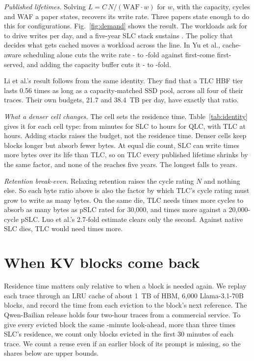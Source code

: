 \documentclass[journal]{IEEEtran}
\begin{document}
\emph{Published lifetimes.} Solving $L = C\,N/(\mathrm{WAF}\cdot w)$ for $w$, with the capacity, cycles and WAF a paper states, recovers its write rate. Three papers state enough to do this for \RecN{} configurations.\cite{yu2026hbf,baek2026hotcold,peng2026gr} Fig.~\ref{fig:demand} shows the result. The workloads ask for \RecDwpdMin{} to \RecDwpdMax{} drive writes per day, and a five-year SLC stack sustains \DwpdSLC{}. The policy that decides what gets cached moves a workload across the line. In Yu et al., cache-aware scheduling alone cuts the write rate \YuPlainCutMin{}- to \YuPlainCutMax{}-fold against first-come first-served, and adding the capacity buffer cuts it \YuCutMin{}- to \YuCutMax{}-fold.

Li et al.'s result follows from the same identity. They find that a TLC HBF tier lasts 0.56 times as long as a capacity-matched SSD pool, across all four of their traces. Their own budgets, 21.7 and 38.4~TB per day, have exactly that ratio.\cite{li2026hbfsucks}

\emph{What a denser cell changes.} The cell sets the residence time. Table~\ref{tab:identity} gives it for each cell type: from \ResSLCmin{} minutes for SLC to \ResQLCh{} hours for QLC, with TLC at \ResTLCh{} hours. Adding stacks raises the budget, not the residence time. Denser cells keep blocks longer but absorb fewer bytes. At equal die count, SLC can write \RatioTLC{} times more bytes over its life than TLC, so on TLC every published lifetime shrinks by the same factor, and none of the \RecN{} reaches five years. The longest falls to \BaekEvictTLC{} years.

\emph{Retention break-even.} Relaxing retention raises the cycle rating $N$ and nothing else. So each byte ratio above is also the factor by which TLC's cycle rating must grow to write as many bytes. On the same die, TLC needs \SameDieMax{} times more cycles to absorb as many bytes as pSLC rated for 30,000, and \SameDieMin{} times more against a 20,000-cycle pSLC. Luo et al.'s 2.7-fold estimate clears only the second. Against native SLC dies, TLC would need \RatioTLC{} times more.

\section{When KV blocks come back}

Residence time matters only relative to when a block is needed again. We replay each trace through an LRU cache of about 1~TB of HBM, 6,000 Llama-3.1-70B blocks, and record the time from each eviction to the block's next reference. The Qwen-Bailian release holds four two-hour traces from a commercial service.\cite{wang2025kvcachewild} To give every evicted block the same \QwWindowMin{}-minute look-ahead, more than three times SLC's residence, we count only blocks evicted in the first 30 minutes of each trace. We count a reuse even if an earlier block of its prompt is missing, so the shares below are upper bounds.
\end{document}
